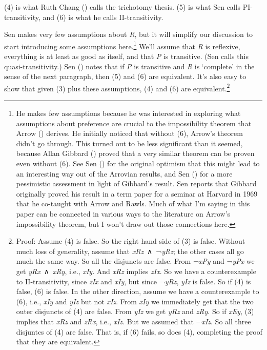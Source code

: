 \documentclass[
  11pt,
  letterpaper,
  DIV=11,
  numbers=noendperiod,
  twoside]{scrartcl}
\begin{document}
(4) is what Ruth Chang () calls the
trichotomy thesis. (5) is what Sen calls PI-transitivity, and (6) is
what he calls II-transitivity.

Sen makes very few assumptions about \emph{R}, but it will simplify our
discussion to start introducing some assumptions here.\footnote{He makes
  few assumptions because he was interested in exploring what
  assumptions about preference are crucial to the impossibility theorem
  that Arrow () derives. He initially
  noticed that without (6), Arrow's theorem didn't go through. This
  turned out to be less significant than it seemed, because Allan
  Gibbard () proved that a very similar
  theorem can be proven even without (6). See Sen
  () for the original optimism that this
  might lead to an interesting way out of the Arrovian results, and Sen
  () for a more pessimistic
  assessment in light of Gibbard's result. Sen reports that Gibbard
  originally proved his result in a term paper for a seminar at Harvard
  in 1969 that he co-taught with Arrow and Rawls. Much of what I'm
  saying in this paper can be connected in various ways to the
  literature on Arrow's impossibility theorem, but I won't draw out
  those connections here.} We'll assume that \emph{R} is reflexive,
everything is at least as good as itself, and that \emph{P} is
transitive. (Sen calls this quasi-transitivity.) Sen
() notes that if \emph{P}
is transitive and \emph{R} is `complete' in the sense of the next
paragraph, then (5) and (6) are equivalent. It's also easy to show that
given (3) plus these assumptions, (4) and (6) are equivalent.\footnote{Proof:
  Assume (4) is false. So the right hand side of (3) is false. Without
  much loss of generality, assume that \emph{xRz}~∧~¬\emph{yRz}; the
  other cases all go much the same way. So all the disjuncts are false.
  From ¬\emph{xPy} and ¬\emph{yPx} we get \emph{yRx}~∧~\emph{xRy}, i.e.,
  \emph{xIy}. And \emph{xRz} implies \emph{zIx}. So we have a
  counterexample to II-transitivity, since \emph{zIx} and \emph{xIy},
  but since ¬\emph{yRz}, \emph{yIz} is false. So if (4) is false, (6) is
  false. In the other direction, assume we have a counterexample to (6),
  i.e., \emph{xIy} and \emph{yIz} but not \emph{xIz}. From \emph{xIy} we
  immediately get that the two outer disjuncts of (4) are false. From
  \emph{yIz} we get \emph{yRz} and \emph{zRy}. So if \emph{xEy}, (3)
  implies that \emph{xRz} and \emph{zRx}, i.e., \emph{xIz}. But we
  assumed that ¬\emph{xIz}. So all three disjuntcs of (4) are false.
  That is, if (6) fails, so does (4), completing the proof that they are
  equivalent.}
\end{document}
